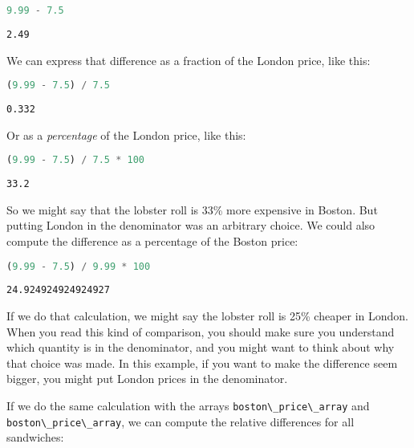 \begin{lstlisting}[language=Python,style=source]
9.99 - 7.5
\end{lstlisting}

\begin{lstlisting}[style=output]
2.49
\end{lstlisting}

We can express that difference as a fraction of the London price, like
this:

\begin{lstlisting}[language=Python,style=source]
(9.99 - 7.5) / 7.5
\end{lstlisting}

\begin{lstlisting}[style=output]
0.332
\end{lstlisting}

Or as a \emph{percentage} of the London price, like this:

\begin{lstlisting}[language=Python,style=source]
(9.99 - 7.5) / 7.5 * 100
\end{lstlisting}

\begin{lstlisting}[style=output]
33.2
\end{lstlisting}

So we might say that the lobster roll is 33\% more expensive in Boston.
But putting London in the denominator was an arbitrary choice. We could
also compute the difference as a percentage of the Boston price:

\begin{lstlisting}[language=Python,style=source]
(9.99 - 7.5) / 9.99 * 100
\end{lstlisting}

\begin{lstlisting}[style=output]
24.924924924924927
\end{lstlisting}

If we do that calculation, we might say the lobster roll is 25\% cheaper
in London. When you read this kind of comparison, you should make sure
you understand which quantity is in the denominator, and you might want
to think about why that choice was made. In this example, if you want to
make the difference seem bigger, you might put London prices in the
denominator.

If we do the same calculation with the arrays
\passthrough{\lstinline!boston\_price\_array!} and
\passthrough{\lstinline!boston\_price\_array!}, we can compute the
relative differences for all sandwiches:

